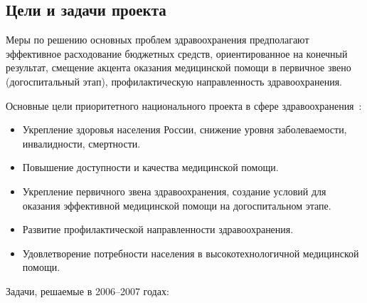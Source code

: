 \documentclass[article, 12pt, russian, oneside]{ncc}
\begin{document}
\subsection{Цели и задачи проекта}

Меры по решению основных проблем здравоохранения предполагают
эффективное расходование бюджетных средств, ориентированное на
конечный результат, смещение акцента оказания медицинской помощи в
первичное звено (догоспитальный этап), профилактическую направленность
здравоохранения.

Основные цели приоритетного национального проекта в сфере
здравоохранения~\cite{Health_Goals}:

\begin{itemize}
\item Укрепление здоровья населения России, снижение уровня
  заболеваемости, инвалидности, смертности.
\item Повышение доступности и качества медицинской помощи.
\item Укрепление первичного звена здравоохранения, создание условий
  для оказания эффективной медицинской помощи на догоспитальном этапе.
\item Развитие профилактической направленности здравоохранения.
\item Удовлетворение потребности населения в высокотехнологичной
  медицинской помощи.
\end{itemize}

Задачи, решаемые в 2006--2007 годах:
\end{document}
